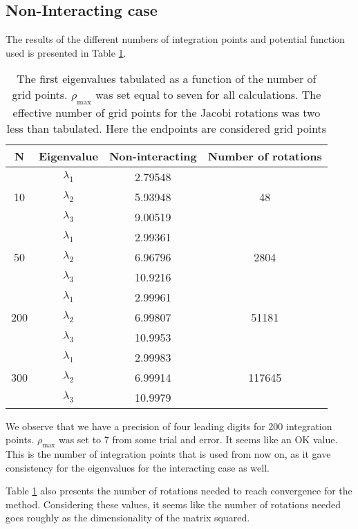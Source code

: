 \documentclass[11pt, a4paper]{article}
\begin{document}
\subsection{Non-Interacting case}
The results of the different numbers of integration points and potential function used is presented in Table \ref{table_eigvals}.
\begin{table}[ht!]
\centering
\footnotesize
\begin{tabular}{c|c|c|c}
N& Eigenvalue & Non-interacting & Number of rotations\\ \hline
\multirow{3}{*}{10} & $\lambda_1$ & 2.79548 & \multirow{3}{*}{48}\\ 
& $\lambda_2$ & 5.93948 & \\ 
& $\lambda_3$ & 9.00519 & \\ \hline
\multirow{3}{*}{50} & $\lambda_1$ & 2.99361 & \multirow{3}{*}{2804}\\ 
& $\lambda_2$ & 6.96796 &\\ 
& $\lambda_3$ & 10.9216 &\\ \hline
\multirow{3}{*}{200} & $\lambda_1$ & 2.99961 & \multirow{3}{*}{51181}\\ 
& $\lambda_2$ & 6.99807 &  \\ 
& $\lambda_3$ & 10.9953 & \\ \hline
\multirow{3}{*}{300} & $\lambda_1$ & 2.99983 & \multirow{3}{*}{117645}\\ 
& $\lambda_2$ & 6.99914 & \\ 
& $\lambda_3$ & 10.9979 & \\ 
\end{tabular}
\caption{The first eigenvalues tabulated as a function of the number of grid points. $\rho_\text{max}$ was set equal to seven for all calculations. The effective number of grid points for the Jacobi rotations was two less than tabulated. Here the endpoints are considered grid points}
\label{table_eigvals}
\end{table}

We observe that we have a precision of four leading digits for 200 integration points. $\rho_\text{max}$ was set to 7 from some trial and error. It seems like an OK value. This is the number of integration points that is used from now on, as it gave consistency for the eigenvalues for the interacting case as well.

Table \ref{table_eigvals} also presents the number of rotations needed to reach convergence for the method. Considering these values, it seems like the number of rotations needed goes roughly as the dimensionality of the matrix squared.
\end{document}
